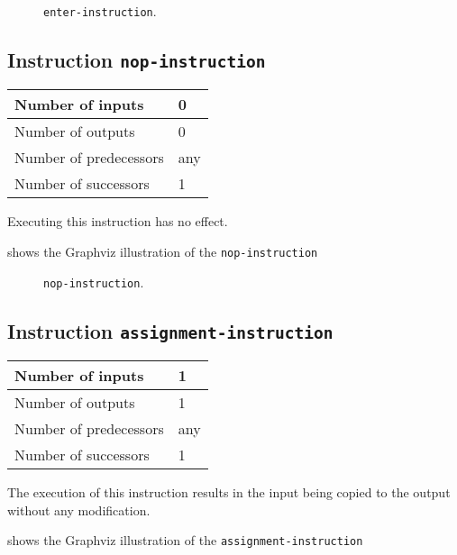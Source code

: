 \begin{figure}
\begin{center}
\end{center}
\caption{\label{fig-enter-instruction}
\texttt{enter-instruction}.}
\end{figure}

\subsection{Instruction \texttt{nop-instruction}}
\label{mir-instruction-nop}

\begin{tabular}{|l|l|}
\hline
Number of inputs & 0\\
\hline
Number of outputs & 0\\
\hline
Number of predecessors & any\\
\hline
Number of successors & 1\\
\hline
\end{tabular}

Executing this instruction has no effect. 

 shows the Graphviz illustration of the
\texttt{nop-instruction}

\begin{figure}
\begin{center}
\end{center}
\caption{\label{fig-nop-instruction}
\texttt{nop-instruction}.}
\end{figure}

\subsection{Instruction \texttt{assignment-instruction}}
\label{mir-instruction-assignment}

\begin{tabular}{|l|l|}
\hline
Number of inputs & 1\\
\hline
Number of outputs & 1\\
\hline
Number of predecessors & any\\
\hline
Number of successors & 1\\
\hline
\end{tabular}

The execution of this instruction results in the input being copied to
the output without any modification. 

 shows the Graphviz illustration of the
\texttt{assignment-instruction}

